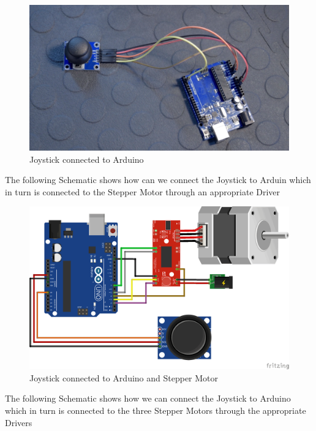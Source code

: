 \documentclass[MTech]{iitmdiss}
\begin{document}
	\begin{figure}[h]
		\includegraphics[width=\linewidth]{ffigures/joyschemareal}
		\centering
		\caption{Joystick connected to Arduino }
		\label{fig:joyschreal}
	
	\end{figure}
\pagebreak
The following Schematic shows how can we connect the Joystick to Arduin which in turn is connected to the Stepper Motor through an appropriate Driver

	\begin{figure}[h]
		\includegraphics[width=\linewidth]{ffigures/joyardstp}
		\centering
		\caption{Joystick connected to Arduino and Stepper Motor }
		\label{fig:joyardstpp}
	
	\end{figure}
	
The following Schematic shows how we can connect the Joystick to Arduino which in turn is connected to the three Stepper Motors through the appropriate Drivers
\end{document}
